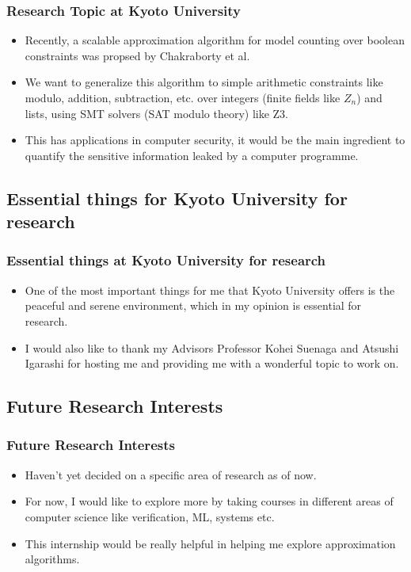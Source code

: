 \documentclass[
	11pt, %
]{beamer}
\begin{document}
\begin{frame}
	\frametitle{Research Topic at Kyoto University}
	\begin{itemize}
		\item Recently, a scalable approximation algorithm for model counting over boolean constraints was propsed by Chakraborty et al.
		\item We want to generalize this algorithm to simple arithmetic constraints like modulo, addition, subtraction, etc. over integers (finite fields like $Z_n$) and lists, using SMT solvers (SAT modulo theory) like Z3.
		\item This has applications in computer security, it would be the main ingredient to quantify the sensitive information leaked by a computer programme.
	\end{itemize}
\end{frame}
\subsection{Essential things for Kyoto University for research}
\begin{frame}
	\frametitle{Essential things at Kyoto University for research}
	\begin{itemize}
	\item One of the most important things for me that Kyoto University offers is the peaceful and serene environment, which in my opinion is essential for research.
	\item I would also like to thank my Advisors Professor Kohei Suenaga and Atsushi Igarashi for hosting me and providing me with a wonderful topic to work on. 
	\end{itemize}
\end{frame}
\subsection{Future Research Interests}
\begin{frame}
	\frametitle{Future Research Interests}
	\begin{itemize}
		\item Haven't yet decided on a specific area of research as of now.
		\item For now, I would like to explore more by taking courses in different areas of computer science like verification, ML, systems etc.
		\item This internship would be really helpful in helping me explore approximation algorithms.
	\end{itemize}
\end{frame}
\end{document}
